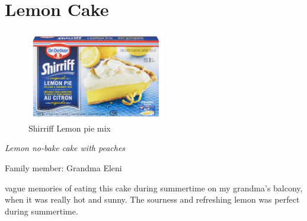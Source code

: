 \chapter{Lemon Cake}
\label{ch:Lemoncake}


\begin{figure}
  \includegraphics[width=60mm]{monanteras/images/Shirriff Lemon pie mix.png}
  \caption{Shirriff Lemon pie mix}
\end{figure}

\textit{Lemon no-bake cake with peaches}

Family member: Grandma Eleni

 vague memories of eating this cake during summertime on my grandma's balcony, when it was really hot and sunny. The sourness and refreshing lemon was perfect during summertime.

